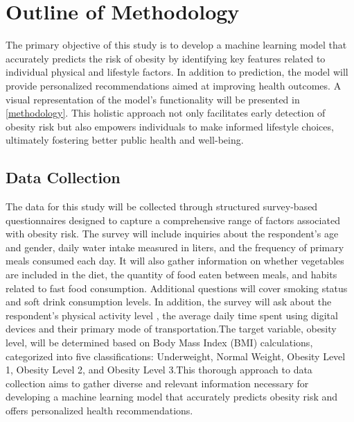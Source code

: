 \section{Outline of Methodology}

The primary objective of this study is to develop a machine learning model that accurately predicts the risk of obesity by identifying key features related to individual physical and lifestyle factors. In addition to prediction, the model will provide personalized recommendations aimed at improving health outcomes. A visual representation of the model’s functionality will be presented in  \ref{methodology}. This holistic approach not only facilitates early detection of obesity risk but also empowers individuals to make informed lifestyle choices, ultimately fostering better public health and well-being. 


\subsection{ Data Collection}
The data for this study will be collected through structured survey-based questionnaires designed to capture a comprehensive range of factors associated with obesity risk. The survey will include inquiries about the respondent's age and gender, daily water intake measured in liters, and the frequency of primary meals consumed each day. It will also gather information on whether vegetables are included in the diet, the quantity of food eaten between meals, and habits related to fast food consumption. Additional questions will cover smoking status and soft drink consumption levels. In addition, the survey will ask about the respondent's physical activity level , the average daily time spent  using digital devices and their primary mode of transportation.The target variable, obesity level, will be determined based on Body Mass Index (BMI) calculations, categorized into five classifications: Underweight, Normal Weight, Obesity Level 1, Obesity Level 2, and Obesity Level 3.This thorough approach to data collection aims to gather diverse and relevant information necessary for developing a machine learning model that accurately predicts obesity risk and offers personalized health recommendations. 

